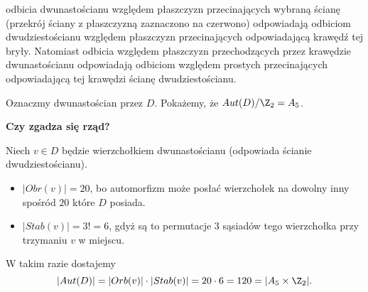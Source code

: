 odbicia dwunastościanu względem płaszczyzn przecinających wybraną ścianę (przekrój ściany z płaszczyzną zaznaczono na czerwono) odpowiadają odbiciom dwudziestościanu względem płaszczyzn przecinających odpowiadającą krawędź tej bryły. Natomiast odbicia względem płaszczyzn przechodzących przez krawędzie dwunastościanu odpowiadają odbiciom względem prostych przecinających odpowiadającą tej krawędzi ścianę dwudziestościanu.



Oznaczmy dwunastościan przez $D$. Pokażemy, że $Aut(D)/\Z_2=A_5$.

\textbf{Czy zgadza się rząd?}

Niech $v\in D$ będzie wierzchołkiem dwunastościanu (odpowiada ścianie dwudziestościanu). 
\begin{itemize}
  \item $|Obr(v)|=20$, bo automorfizm może posłać wierzchołek na dowolny inny spośród $20$ które $D$ posiada.
  \item $|Stab(v)| = 3!=6$, gdyż są to permutacje $3$ sąsiadów tego wierzchołka przy trzymaniu $v$ w miejscu.
\end{itemize}
W takim razie dostajemy
$$|Aut(D)|=|Orb(v)|\cdot|Stab(v)|=20\cdot 6=120=|A_5\times \Z_2|.$$

\newpage

